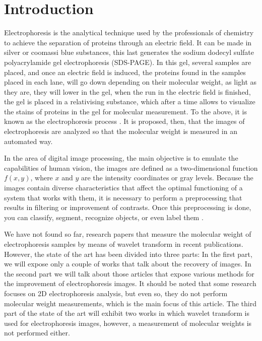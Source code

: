 \documentclass[a4paper]{llncs}
\begin{document}
%
%
%

\section{Introduction}

Electrophoresis is the analytical technique used by the professionals of chemistry to achieve the separation of proteins through an electric field. It can be made in silver or coomassi blue substances, this last generates the sodium dodecyl sulfate polyacrylamide gel electrophoresis (SDS-PAGE). In this gel, several samples are placed, and once an electric field is induced, the proteins found in the samples placed in each lane, will go down depending on their molecular weight, as light as they are, they will lower in the gel, when the run in the electric field is finished, the gel is placed in a relativising substance, which after a time allows to visualize the stains of proteins in the gel for molecular measurement. To the above, it is known as the electrophoresis process \cite{Horton}. It is proposed, then, that the images of electrophoresis are analyzed so that the molecular weight is measured in an automated way.

In the area of ​​digital image processing, the main objective is to emulate the capabilities of human vision, the images are defined as a two-dimensional function
 $f(x, y)$, where $x$ and $y$ are the intensity coordinates or gray levels. Because the images contain diverse characteristics that affect the optimal 
functioning of a system that works with them, it is necessary to perform a preprocessing that results in filtering or improvement of contrasts. 
Once this preprocessing is done, you can classify, segment, recognize objects, or even label them \cite{Gonzalez}.

We have not found so far, research papers that measure the molecular weight of electrophoresis samples by means of wavelet transform in recent publications. However, the state of the art has been divided into three parts: In the first part, we will expose only a couple of works that talk about the recovery of images. In the second part we will talk about those articles that expose various methods for the improvement of electrophoresis images. It should be noted that some research focuses on 2D electrophoresis analysis, but even so, they do not perform molecular weight measurements, which is the main focus of this article. The third part of the state of the art will exhibit two works in which wavelet transform is used for electrophoresis images, however, a measurement of molecular weights is not performed either.
\end{document}
